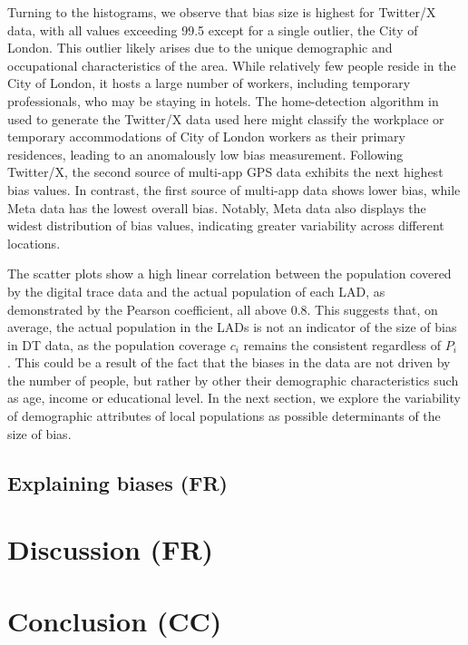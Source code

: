 \documentclass[]{rsos}%
\begin{document}
Turning to the histograms, we observe that bias size is highest for
Twitter/X data, with all values exceeding 99.5 except for a single
outlier, the City of London. This outlier likely arises due to the
unique demographic and occupational characteristics of the area. While
relatively few people reside in the City of London, it hosts a large
number of workers, including temporary professionals, who may be staying
in hotels. The home-detection algorithm in \citep{wang2022} used to generate
the Twitter/X data used here might classify the workplace or temporary
accommodations of City of London workers as their primary residences,
leading to an anomalously low bias measurement. Following Twitter/X, the
second source of multi-app GPS data exhibits the next highest bias
values. In contrast, the first source of multi-app data shows lower
bias, while Meta data has the lowest overall bias. Notably, Meta data
also displays the widest distribution of bias values, indicating greater
variability across different locations.

The scatter plots show a high linear correlation between the population
covered by the digital trace data and the actual population of each LAD,
as demonstrated by the Pearson coefficient, all above 0.8. This suggests
that, on average, the actual population in the LADs is not an indicator
of the size of bias in DT data, as the population coverage \(c_i\) remains
the consistent regardless of \(P_i\) . This could be a result of the fact
that the biases in the data are not driven by the number of people, but
rather by other their demographic characteristics such as age, income or
educational level. In the next section, we explore the variability of
demographic attributes of local populations as possible determinants of
the size of bias.

\subsection{Explaining biases (FR)}\label{explaining-biases-fr}

\section{Discussion (FR)}\label{discussion-fr}

\section{Conclusion (CC)}\label{conclusion-cc}
\end{document}
